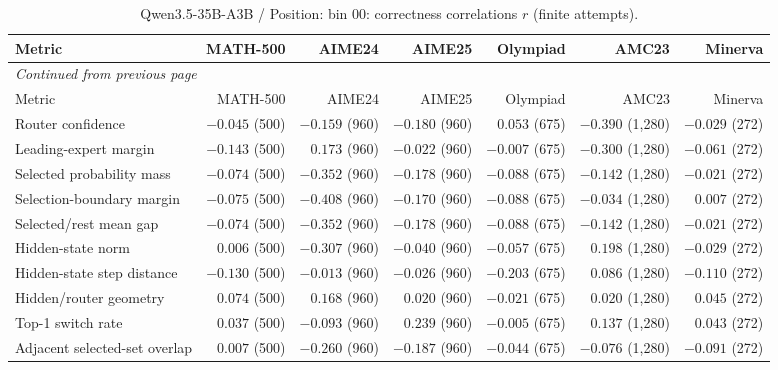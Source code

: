 \begingroup\scriptsize\setlength{\tabcolsep}{4pt}
\begin{longtable}{@{}lrrrrrr@{}}
\caption{Qwen3.5-35B-A3B / Position: bin 00: correctness correlations $r$ (finite attempts).}\label{tab:multi-qwen-position-bin_00}\\
\toprule
Metric & MATH-500 & AIME24 & AIME25 & Olympiad & AMC23 & Minerva \\
\midrule\endfirsthead
\multicolumn{7}{l}{\textit{Continued from previous page}}\\
\toprule
Metric & MATH-500 & AIME24 & AIME25 & Olympiad & AMC23 & Minerva \\
\midrule\endhead
\bottomrule\endfoot
Router confidence & $-0.045$ (500) & $-0.159$ (960) & $-0.180$ (960) & $0.053$ (675) & $-0.390$ (1,280) & $-0.029$ (272) \\
Leading-expert margin & $-0.143$ (500) & $0.173$ (960) & $-0.022$ (960) & $-0.007$ (675) & $-0.300$ (1,280) & $-0.061$ (272) \\
Selected probability mass & $-0.074$ (500) & $-0.352$ (960) & $-0.178$ (960) & $-0.088$ (675) & $-0.142$ (1,280) & $-0.021$ (272) \\
Selection-boundary margin & $-0.075$ (500) & $-0.408$ (960) & $-0.170$ (960) & $-0.088$ (675) & $-0.034$ (1,280) & $0.007$ (272) \\
Selected/rest mean gap & $-0.074$ (500) & $-0.352$ (960) & $-0.178$ (960) & $-0.088$ (675) & $-0.142$ (1,280) & $-0.021$ (272) \\
Hidden-state norm & $0.006$ (500) & $-0.307$ (960) & $-0.040$ (960) & $-0.057$ (675) & $0.198$ (1,280) & $-0.029$ (272) \\
Hidden-state step distance & $-0.130$ (500) & $-0.013$ (960) & $-0.026$ (960) & $-0.203$ (675) & $0.086$ (1,280) & $-0.110$ (272) \\
Hidden/router geometry & $0.074$ (500) & $0.168$ (960) & $0.020$ (960) & $-0.021$ (675) & $0.020$ (1,280) & $0.045$ (272) \\
Top-1 switch rate & $0.037$ (500) & $-0.093$ (960) & $0.239$ (960) & $-0.005$ (675) & $0.137$ (1,280) & $0.043$ (272) \\
Adjacent selected-set overlap & $0.007$ (500) & $-0.260$ (960) & $-0.187$ (960) & $-0.044$ (675) & $-0.076$ (1,280) & $-0.091$ (272) \\
\end{longtable}\endgroup

